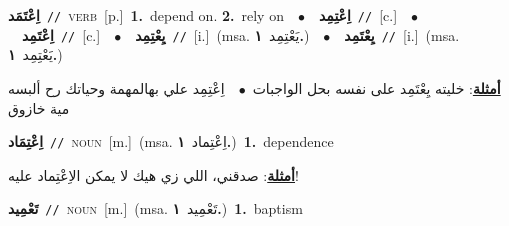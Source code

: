 \documentclass[10pt,a4paper,twoside]{article} %
\begin{document}
\begin{multicols}{2}
{\setlength\topsep{0pt}\textbf{\foreignlanguage{arabic}{اِعْتَمَد}}\ {\color{gray}\texttt{//}\color{black}}\ \textsc{verb}\ [p.]\ \textbf{1.}~depend on.  \textbf{2.}~rely on\ \ $\bullet$\ \ \setlength\topsep{0pt}\textbf{\foreignlanguage{arabic}{اِعْتِمِد}}\ {\color{gray}\texttt{//}\color{black}}\ [c.]\ \ $\bullet$\ \ \setlength\topsep{0pt}\textbf{\foreignlanguage{arabic}{اِعْتَمِد}}\ {\color{gray}\texttt{//}\color{black}}\ [c.]\ \ $\bullet$\ \ \setlength\topsep{0pt}\textbf{\foreignlanguage{arabic}{يِعْتِمِد}}\ {\color{gray}\texttt{//}\color{black}}\ [i.]\ \color{gray}(msa. \foreignlanguage{arabic}{يَعْتِمِد}~\foreignlanguage{arabic}{\textbf{١.}})\color{black}\ \ $\bullet$\ \ \setlength\topsep{0pt}\textbf{\foreignlanguage{arabic}{يِعْتَمِد}}\ {\color{gray}\texttt{//}\color{black}}\ [i.]\ \color{gray}(msa. \foreignlanguage{arabic}{يَعْتِمِد}~\foreignlanguage{arabic}{\textbf{١.}})\color{black}\  \begin{flushright}\color{gray}\foreignlanguage{arabic}{\textbf{\underline{\foreignlanguage{arabic}{أمثلة}}}: خليته يِعْتَمِد على نفسه بحل الواجبات\ $\bullet$\ \  اِعْتِمِد علي بهالمهمة وحياتك رح ألبسه مية خازوق}\end{flushright}\color{black}} \vspace{2mm}

{\setlength\topsep{0pt}\textbf{\foreignlanguage{arabic}{اِعْتِمَاد}}\ {\color{gray}\texttt{//}\color{black}}\ \textsc{noun}\ [m.]\ \color{gray}(msa. \foreignlanguage{arabic}{اِعْتِماد}~\foreignlanguage{arabic}{\textbf{١.}})\color{black}\ \textbf{1.}~dependence\  \begin{flushright}\color{gray}\foreignlanguage{arabic}{\textbf{\underline{\foreignlanguage{arabic}{أمثلة}}}: صدقني، اللي زي هيك لا يمكن الاِعْتِماد عليه!}\end{flushright}\color{black}} \vspace{2mm}

{\setlength\topsep{0pt}\textbf{\foreignlanguage{arabic}{تَعْمِيد}}\ {\color{gray}\texttt{//}\color{black}}\ \textsc{noun}\ [m.]\ \color{gray}(msa. \foreignlanguage{arabic}{تَعْمِيد}~\foreignlanguage{arabic}{\textbf{١.}})\color{black}\ \textbf{1.}~baptism\ } \vspace{2mm}


\end{multicols}
\end{document}
